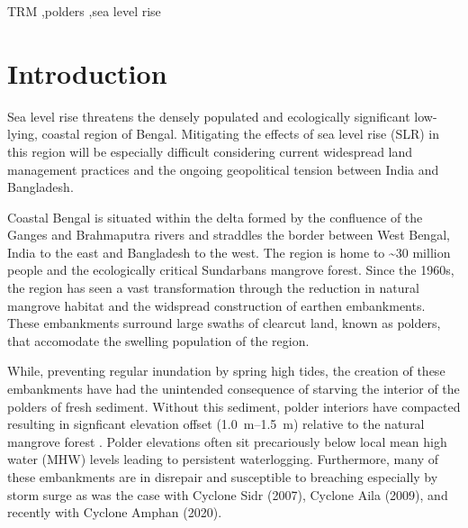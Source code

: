 \documentclass[a4paper,fleqn]{cas-dc}
\begin{document}

\begin{keywords}
TRM \sep polders \sep sea level rise
\end{keywords}

\maketitle

\section{Introduction}

Sea level rise threatens the densely populated and ecologically significant low-lying, coastal region of Bengal. Mitigating the effects of sea level rise (SLR) in this region will be especially difficult considering current widespread land management practices and the ongoing geopolitical tension between India and Bangladesh.

Coastal Bengal is situated within the delta formed by the confluence of the Ganges and Brahmaputra rivers and straddles the border between West Bengal, India to the east and Bangladesh to the west. The region is home to \textasciitilde30 million people \citep{centerforinternationalearthscienceinformationnetwork-ciesin-columbiauniversityPopulationEstimationService2018} and the ecologically critical Sundarbans mangrove forest. Since the 1960s, the region has seen a vast transformation through the reduction in natural mangrove habitat and the widspread construction of earthen embankments. These embankments surround large swaths of clearcut land, known as polders, that accomodate the swelling population of the region.

While, preventing regular inundation by spring high tides, the creation of these embankments have had the unintended consequence of starving the interior of the polders of fresh sediment. Without this sediment, polder interiors have compacted resulting in signficant elevation offset (\SIrange{1.0}{1.5}{\meter}) relative to the natural mangrove forest \citep{auerbachFloodRiskNatural2015}. Polder elevations often sit precariously below local mean high water (MHW) levels leading to persistent waterlogging. Furthermore, many of these embankments are in disrepair and susceptible to breaching especially by storm surge as was the case with Cyclone Sidr (2007), Cyclone Aila (2009), and recently with Cyclone Amphan (2020).
\end{document}
